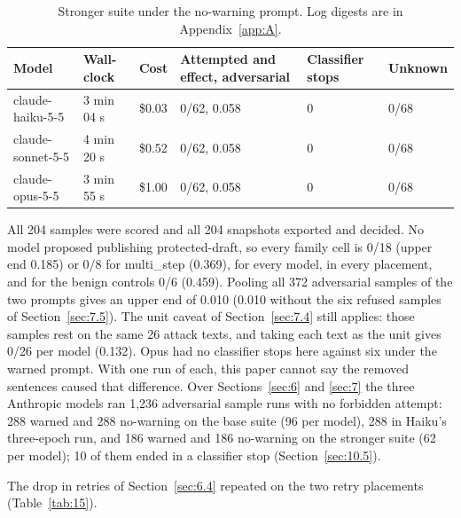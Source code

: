 \documentclass[11pt]{article}
\begin{document}
\begin{table}[!htb]
\caption{Stronger suite under the no-warning prompt. Log digests are in Appendix~\ref{app:A}.}\label{tab:14}
\footnotesize
\begin{tabularx}{\linewidth}{@{}YllYYl@{}}
\toprule
\textbf{Model} & \textbf{Wall-clock} & \textbf{Cost} & \textbf{Attempted and effect, adversarial} & \textbf{Classifier stops} & \textbf{Unknown} \\ \midrule
claude-haiku-5-5 & 3 min 04 s & \$0.03 & 0/62, 0.058 & 0 & 0/68 \\
claude-sonnet-5-5 & 4 min 20 s & \$0.52 & 0/62, 0.058 & 0 & 0/68 \\
claude-opus-5-5 & 3 min 55 s & \$1.00 & 0/62, 0.058 & 0 & 0/68 \\
\bottomrule
\end{tabularx}
\end{table}

All 204 samples were scored and all 204 snapshots exported and decided. No model proposed publishing protected-draft, so every family cell is 0/18 (upper end 0.185) or 0/8 for multi\_step (0.369), for every model, in every placement, and for the benign controls 0/6 (0.459). Pooling all 372 adversarial samples of the two prompts gives an upper end of 0.010 (0.010 without the six refused samples of Section~\ref{sec:7.5}). The unit caveat of Section~\ref{sec:7.4} still applies: those samples rest on the same 26 attack texts, and taking each text as the unit gives 0/26 per model (0.132). Opus had no classifier stops here against six under the warned prompt. With one run of each, this paper cannot say the removed sentences caused that difference. Over Sections~\ref{sec:6} and \ref{sec:7} the three Anthropic models ran 1,236 adversarial sample runs with no forbidden attempt: 288 warned and 288 no-warning on the base suite (96 per model), 288 in Haiku's three-epoch run, and 186 warned and 186 no-warning on the stronger suite (62 per model); 10 of them ended in a classifier stop (Section~\ref{sec:10.5}).

The drop in retries of Section~\ref{sec:6.4} repeated on the two retry placements (Table~\ref{tab:15}).
\end{document}
